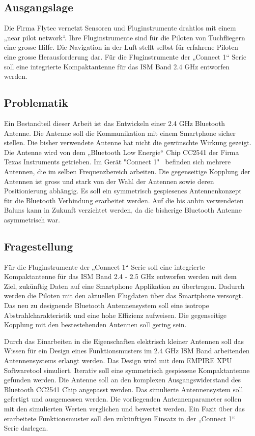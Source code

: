 \subsection{Ausgangslage}
Die Firma Flytec vernetzt Sensoren und Fluginstrumente drahtlos mit einem  „near pilot network“. Ihre Fluginstrumente sind für die Piloten von Tuchfliegern eine grosse Hilfe. Die Navigation in der Luft stellt selbst für erfahrene Piloten eine grosse Herausforderung dar. Für die Fluginstrumente der „Connect 1“ Serie  soll eine integrierte Kompaktantenne für das ISM Band 2.4 GHz entworfen werden. 

\subsection{Problematik}
Ein Bestandteil dieser Arbeit ist das Entwickeln einer 2.4 GHz Bluetooth Antenne. Die Antenne soll die Kommunikation mit einem Smartphone sicher stellen. Die bisher verwendete Antenne hat nicht die gewünschte Wirkung gezeigt. Die Antenne wird von dem „Bluetooth Low Energie“ Chip CC2541 der Firma Texas Instruments getrieben. Im Gerät "Connect 1" \ befinden sich mehrere Antennen, die im selben Frequenzbereich arbeiten. Die gegenseitige Kopplung der Antennen ist gross und  stark von der Wahl der Antennen sowie deren Positionierung abhängig. Es soll ein  symmetrisch gespiesenes Antennenkonzept für die Bluetooth Verbindung erarbeitet werden. Auf die bis anhin verwendeten Baluns kann in Zukunft verzichtet werden, da die bisherige Bluetooth Antenne asymmetrisch war. 
\subsection{Fragestellung}
Für die Fluginstrumente der „Connect 1“ Serie  soll eine integrierte Kompaktantenne für das ISM Band 2.4 - 2.5 GHz entworfen werden mit dem Ziel, zukünftig Daten auf eine Smartphone Applikation zu übertragen. Dadurch werden die Piloten mit den aktuellen Flugdaten über das Smartphone  versorgt. Das neu zu designende Bluetooth Antennensystem soll eine isotrope Abstrahlcharakteristik und eine
 hohe Effizienz aufweisen. Die gegenseitige Kopplung mit den bestestehenden Antennen soll gering sein. 


Durch das Einarbeiten in die Eigenschaften elektrisch kleiner Antennen soll das Wissen für ein Design eines Funktionsmusters  im 2.4 GHz ISM Band arbeitenden Antennensystems erlangt werden. Das Design wird mit dem EMPIRE XPU Softwaretool simuliert. Iterativ soll eine symmetrisch gespiesene Kompaktantenne gefunden werden. Die Antenne soll an den komplexen Ausgangswiderstand des Bluetooth CC2541 Chip angepasst werden. Das simulierte Antennensystem soll gefertigt und ausgemessen werden. Die vorliegenden Antennenparameter sollen mit den simulierten Werten verglichen und bewertet werden. Ein Fazit über das erarbeitete Funktionsmuster soll den zukünftigen Einsatz in der „Connect 1“ Serie darlegen.

